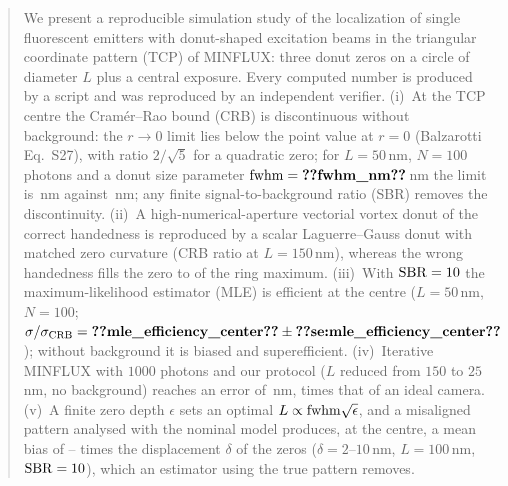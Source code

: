 \begin{abstract}
We present a reproducible simulation study of the localization of single fluorescent emitters
with donut-shaped excitation beams in the triangular coordinate pattern (TCP) of MINFLUX: three
donut zeros on a circle of diameter $L$ plus a central exposure. Every computed number is produced
by a script and was reproduced by an independent verifier. (i)~At the TCP centre the
Cram\'er--Rao bound (CRB) is discontinuous without background: the $r\to0$ limit lies below the
point value at $r=0$ (Balzarotti Eq.~S27), with ratio $2/\sqrt5$ for a quadratic zero; for
$L=50$\,nm, $N=100$ photons and a donut size parameter $\fwhm=\pnum{fwhm_nm}\src{fwhm_nm}$\,nm
the limit is \,nm against
\,nm; any finite
signal-to-background ratio (SBR) removes the discontinuity. (ii)~A high-numerical-aperture
vectorial vortex donut of the correct handedness is reproduced by a scalar Laguerre--Gauss
donut with matched zero curvature (CRB ratio
 at $L=150$\,nm), whereas
the wrong handedness fills the zero to
 of the
ring maximum. (iii)~With $\sbr=10$ the maximum-likelihood estimator (MLE) is efficient at the
centre ($L=50$\,nm, $N=100$;$\sigma/\crb=\pnum{mle_efficiency_center}\pm\pnumse{mle_efficiency_center}$);
without background it is biased and superefficient. (iv)~Iterative MINFLUX with $1000$ photons and
our protocol ($L$ reduced from $150$ to $25$\,nm, no background) reaches an error of
\,nm,
 times that of an
ideal camera. (v)~A finite zero depth $\epsilon$ sets an optimal $L\propto\fwhm\sqrt{\epsilon}$, and
a misaligned pattern analysed with the nominal model produces, at the centre, a
mean bias of
--
times the displacement $\delta$ of the zeros ($\delta=2$--$10$\,nm, $L=100$\,nm, $\sbr=10$),
which an estimator using the true pattern
removes.
\end{abstract}
